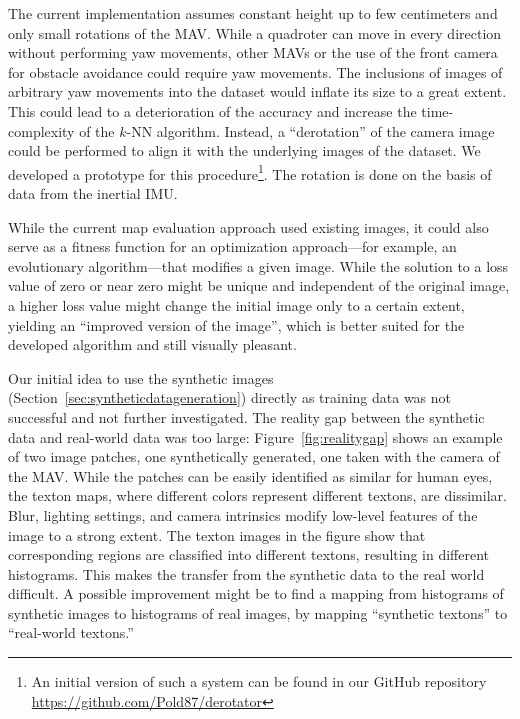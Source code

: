 \documentclass[11pt]{report}
\begin{document}
The current implementation assumes constant height up to few
centimeters and only small rotations of the MAV. While a quadroter can
move in every direction without performing yaw movements, other MAVs
or the use of the front camera for obstacle avoidance could require
yaw movements. The inclusions of images of arbitrary yaw movements
into the dataset would inflate its size to a great extent. This could
lead to a deterioration of the accuracy and increase the
time-complexity of the $k$-NN algorithm. Instead, a ``derotation'' of
the camera image could be performed to align it with the underlying
images of the dataset. We developed a prototype for this
procedure\footnote{An initial version of such a system can be found in
  our GitHub repository\\\url{https://github.com/Pold87/derotator}}.
The rotation is done on the basis of data from the inertial
IMU.


While the current map evaluation approach used existing images, it
could also serve as a fitness function for an optimization
approach---for example, an evolutionary algorithm---that modifies a
given image. While the solution to a loss value of zero or near zero
might be unique and independent of the original image, a higher loss
value might change the initial image only to a certain extent,
yielding an ``improved version of the image'', which is better suited
for the developed algorithm and still visually pleasant.

Our initial idea to use the synthetic images
(Section~\ref{sec:syntheticdatageneration}) directly as training
data was not successful and not further investigated.
The reality gap between the synthetic data and real-world data was too
large: Figure~\ref{fig:realitygap} shows an example of two image
patches, one synthetically generated, one taken with the camera of the
MAV. While the patches can be easily identified as similar for human
eyes, the texton maps, where different colors represent different
textons, are dissimilar. Blur, lighting settings, and camera
intrinsics modify low-level features of the image to a strong extent.
The texton images in the figure show that corresponding regions are
classified into different textons, resulting in different
histograms. This makes the transfer from the synthetic data to the
real world difficult.
A possible improvement might be to find a mapping from histograms of
synthetic images to histograms of real images, by mapping ``synthetic
textons'' to ``real-world textons.''
\end{document}

